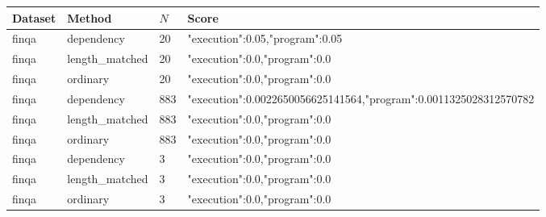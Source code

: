 \begin{tabular}{llll}
Dataset & Method & $N$ & Score \\
\hline
finqa & dependency & 20 & {"execution":0.05,"program":0.05} \\
finqa & length\_matched & 20 & {"execution":0.0,"program":0.0} \\
finqa & ordinary & 20 & {"execution":0.0,"program":0.0} \\
finqa & dependency & 883 & {"execution":0.0022650056625141564,"program":0.0011325028312570782} \\
finqa & length\_matched & 883 & {"execution":0.0,"program":0.0} \\
finqa & ordinary & 883 & {"execution":0.0,"program":0.0} \\
finqa & dependency & 3 & {"execution":0.0,"program":0.0} \\
finqa & length\_matched & 3 & {"execution":0.0,"program":0.0} \\
finqa & ordinary & 3 & {"execution":0.0,"program":0.0} \\
\end{tabular}
